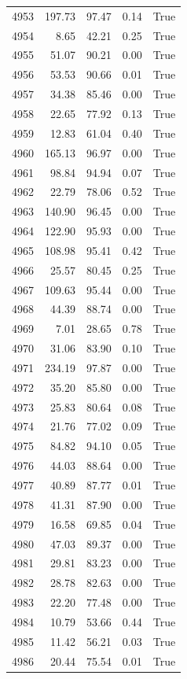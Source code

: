\begin{longtable}{rrrrr}
4953 & 197.73 & 97.47 & 0.14 & True \\
4954 & 8.65 & 42.21 & 0.25 & True \\
4955 & 51.07 & 90.21 & 0.00 & True \\
4956 & 53.53 & 90.66 & 0.01 & True \\
4957 & 34.38 & 85.46 & 0.00 & True \\
4958 & 22.65 & 77.92 & 0.13 & True \\
4959 & 12.83 & 61.04 & 0.40 & True \\
4960 & 165.13 & 96.97 & 0.00 & True \\
4961 & 98.84 & 94.94 & 0.07 & True \\
4962 & 22.79 & 78.06 & 0.52 & True \\
4963 & 140.90 & 96.45 & 0.00 & True \\
4964 & 122.90 & 95.93 & 0.00 & True \\
4965 & 108.98 & 95.41 & 0.42 & True \\
4966 & 25.57 & 80.45 & 0.25 & True \\
4967 & 109.63 & 95.44 & 0.00 & True \\
4968 & 44.39 & 88.74 & 0.00 & True \\
4969 & 7.01 & 28.65 & 0.78 & True \\
4970 & 31.06 & 83.90 & 0.10 & True \\
4971 & 234.19 & 97.87 & 0.00 & True \\
4972 & 35.20 & 85.80 & 0.00 & True \\
4973 & 25.83 & 80.64 & 0.08 & True \\
4974 & 21.76 & 77.02 & 0.09 & True \\
4975 & 84.82 & 94.10 & 0.05 & True \\
4976 & 44.03 & 88.64 & 0.00 & True \\
4977 & 40.89 & 87.77 & 0.01 & True \\
4978 & 41.31 & 87.90 & 0.00 & True \\
4979 & 16.58 & 69.85 & 0.04 & True \\
4980 & 47.03 & 89.37 & 0.00 & True \\
4981 & 29.81 & 83.23 & 0.00 & True \\
4982 & 28.78 & 82.63 & 0.00 & True \\
4983 & 22.20 & 77.48 & 0.00 & True \\
4984 & 10.79 & 53.66 & 0.44 & True \\
4985 & 11.42 & 56.21 & 0.03 & True \\
4986 & 20.44 & 75.54 & 0.01 & True \\

\end{longtable}
